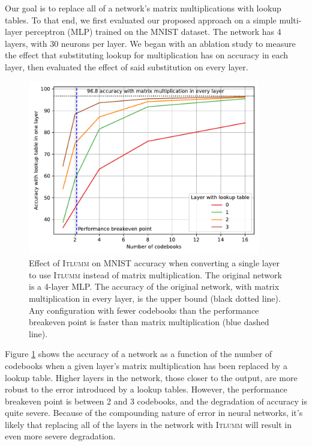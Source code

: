 \documentclass{article}
\begin{document}
Our goal is to replace all of a network's matrix multiplications with lookup tables. To that end, we first evaluated our proposed approach on a simple multi-layer perceptron (MLP) trained on the MNIST dataset. The network has 4 layers, with 30 neurons per layer. We began with an ablation study to measure the effect that substituting lookup for multiplication has on accuracy in each layer, then evaluated the effect of said substitution on every layer.

\begin{figure}[h!]
    \centering
    \includegraphics[width=4.0in]{figures/results-030.pdf}
    \caption{Effect of \textsc{Itlumm} on MNIST accuracy when converting a single layer to use \textsc{Itlumm} instead of matrix multiplication. The original network is a 4-layer MLP. The accuracy of the original network, with matrix multiplication in every layer, is the upper bound (black dotted line). Any configuration with fewer codebooks than the performance breakeven point is faster than matrix multiplication (blue dashed line).}
    \label{fig:mnist-ablation}
\end{figure}

Figure \ref{fig:mnist-ablation} shows the accuracy of a network as a function of the number of codebooks when a given layer's matrix multiplication has been replaced by a lookup table. Higher layers in the network, those closer to the output, are more robust to the error introduced by a lookup tables. However, the performance breakeven point is between 2 and 3 codebooks, and the degradation of accuracy is quite severe. Because of the compounding nature of error in neural networks, it's likely that replacing all of the layers in the network with \textsc{Itlumm} will result in even more severe degradation.
\end{document}
